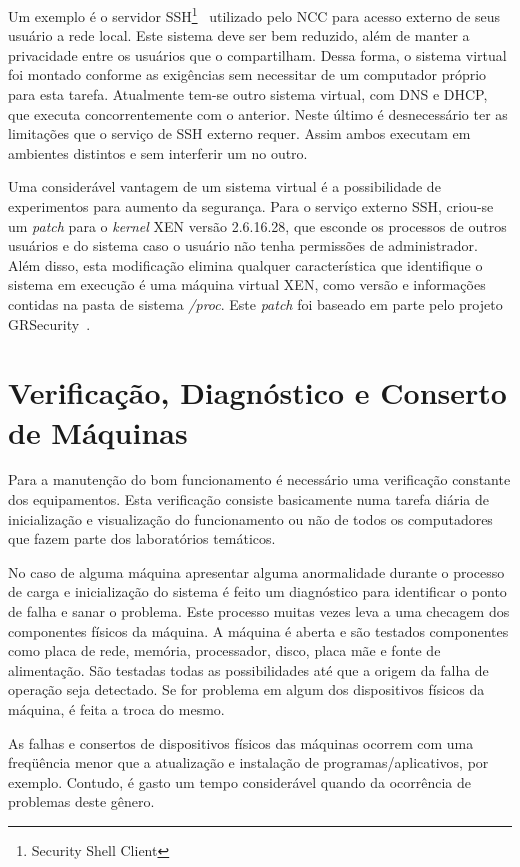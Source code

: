 \documentclass[a4paper,11pt]{article}
\begin{document}
Um exemplo é o servidor SSH\footnote{Security Shell
Client}~\cite{ssh} utilizado pelo NCC para acesso externo de seus
usuário a rede local. Este sistema deve ser bem reduzido, além de
manter a privacidade entre os usuários que o compartilham. Dessa forma,
o sistema virtual foi montado conforme as exigências sem
necessitar de um computador próprio para esta tarefa. Atualmente
tem-se outro sistema virtual, com DNS e DHCP, que executa
concorrentemente com o
anterior. Neste último é desnecessário ter as limitações que o serviço
de SSH externo requer. Assim ambos executam em ambientes distintos e
sem interferir um no outro.

Uma considerável vantagem de um sistema virtual é a possibilidade de
experimentos para aumento da segurança. Para o serviço externo SSH,
criou-se um \textit{patch} para o \textit{kernel} XEN versão 2.6.16.28, que
esconde os processos de outros usuários e do sistema caso o usuário não
tenha permissões de administrador. Além disso, esta modificação elimina
qualquer característica que identifique o sistema em execução é
uma máquina virtual XEN, como
versão e informações contidas na pasta de sistema \textit{/proc}.
Este \textit{patch} foi baseado em parte pelo projeto
GRSecurity~\cite{grsec}.

\section{Verificação, Diagnóstico e Conserto de Máquinas}

Para a manutenção do bom funcionamento é necessário uma verificação
constante dos equipamentos.
Esta verificação consiste basicamente numa tarefa diária de 
inicialização e
visualização do funcionamento ou não de todos os computadores que fazem
parte dos laboratórios temáticos.

No caso de alguma máquina apresentar alguma anormalidade durante o 
processo 
de carga e inicialização do sistema é feito um diagnóstico para
identificar
o ponto de falha e sanar o problema.
Este processo muitas vezes leva a uma checagem dos componentes físicos da
máquina.
A máquina é aberta e são testados componentes como placa de rede, memória,
processador, disco, placa mãe e fonte de alimentação.
São testadas todas as possibilidades até que a origem da falha de operação
seja detectado.
Se for problema em algum dos dispositivos físicos da máquina, é feita a
troca do mesmo.

As falhas e consertos de dispositivos físicos das máquinas ocorrem com 
uma freqüência menor que a atualização e instalação de 
programas/aplicativos, por exemplo.
Contudo, é gasto um tempo considerável quando da ocorrência de problemas
deste gênero.
\end{document}
